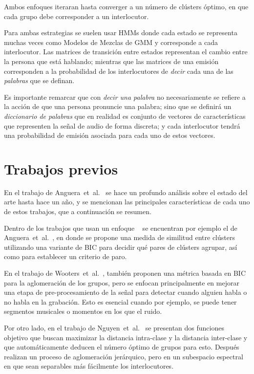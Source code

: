 Ambos enfoques iteraran hasta converger a un número de clústers óptimo, en que cada grupo debe corresponder a un interlocutor.

Para ambas estrategias se suelen usar \acp{HMM} donde cada estado se representa muchas veces como Modelos de Mezclas de \ac{GMM} y corresponde a cada interlocutor. Las matrices de transición entre estados representan el cambio entre la persona que está hablando; mientras que las matrices de una emisión corresponden a la probabilidad de los interlocutores de \textit{decir} cada una de las \textit{palabras} que se definan.

Es importante remarcar que con \textit{decir una palabra} no necesariamente se refiere a la acción de que una persona pronuncie una palabra; sino que se definirá un \textit{diccionario de palabras} que en realidad es conjunto de vectores de características que representen la señal de audio de forma discreta; y cada interlocutor tendrá una probabilidad de emisión asociada para cada uno de estos vectores.

\section{Trabajos previos}

En el trabajo de Anguera~et~al.~\cite{AngueraMiro2012} se hace un profundo análisis sobre el estado del arte hasta hace un año, y se mencionan las principales características de cada uno de estos trabajos, que a continuación se resumen.

Dentro de los trabajos que usan un enfoque \bu~ se encuentran por ejemplo el de Anguera~et~al.~\cite{AngueraMiro2006}, en donde se propone una medida de similitud entre clústers utilizando una variante de \ac{BIC} para decidir qué pares de clústers agrupar, así como para establecer un criterio de paro.

En el trabajo de Wooters~et~al.~\cite{Wooters2007}, también proponen una métrica basada en \ac{BIC} para la aglomeración de los grupos, pero se enfocan principalmente en mejorar una etapa de pre-procesamiento de la señal para detectar cuando alguien habla o no habla en la grabación. Esto es esencial cuando por ejemplo, se puede tener segmentos musicales o momentos en los que el ruido.

Por otro lado, en el trabajo de Nguyen~et~al.~\cite{Nguyen2009} se presentan dos funciones objetivo que buscan maximizar la distancia intra-clase y la distancia inter-clase y que automáticamente deducen el número óptimo de grupos para esto. Después realizan un proceso de aglomeración jerárquico, pero en un subespacio espectral en que sean separables más fácilmente los interlocutores.

